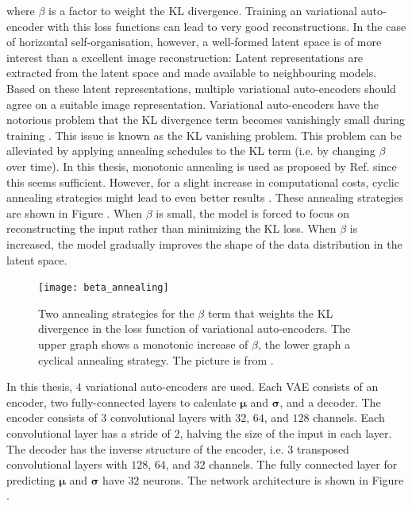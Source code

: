 where $\beta$ is a factor to weight the KL divergence. Training an variational auto-encoder with this loss functions can lead to very good reconstructions.
In the case of horizontal self-organisation, however, a well-formed latent space is of more interest than a excellent image reconstruction: Latent representations are extracted from the latent space and made available to neighbouring models. Based on these latent representations, multiple variational auto-encoders should agree on a suitable image representation.
Variational auto-encoders have the notorious problem that the KL divergence term becomes vanishingly small during training . This issue is known as the KL vanishing problem.
This problem can be alleviated by applying annealing schedules to the KL term (i.e. by changing $\beta$ over time).
In this thesis, monotonic annealing is used as proposed by Ref. \cite{bowman2016generating} since this seems sufficient.
However, for a slight increase in computational costs, cyclic annealing strategies might lead to even better results .
These annealing strategies are shown in Figure . When $\beta$ is small, the model is forced to focus on reconstructing the input rather than minimizing the KL loss.
When $\beta$ is increased, the model gradually improves the shape of the data distribution in the latent space.

\begin{figure}[h]
    \centering
    \texttt{[image: beta\_annealing]}
    \caption[Annealing strategy of the KL weight term in variational auto-encoders]{Two annealing strategies for the $\beta$ term that weights the KL divergence in the loss function of variational auto-encoders. The upper graph shows a monotonic increase of $\beta$, the lower graph a cyclical annealing strategy. The picture is from \cite{Fu_Li_Liu_Gao_Celikyilmaz_Carin_2019}.}
\end{figure}


In this thesis, $4$ variational auto-encoders are used. Each VAE consists of an encoder, two fully-connected layers to calculate $\boldsymbol{\mu}$ and $\boldsymbol{\sigma}$, and a decoder.
The encoder consists of $3$  convolutional layers with $32$, $64$, and $128$ channels. Each convolutional layer has a stride of $2$, halving the size of the input in each layer.
The decoder has the inverse structure of the encoder, i.e. $3$ transposed convolutional layers with $128$, $64$, and $32$ channels.
The fully connected layer for predicting $\boldsymbol{\mu}$ and $\boldsymbol{\sigma}$ have $32$ neurons.
The network architecture is shown in Figure .



